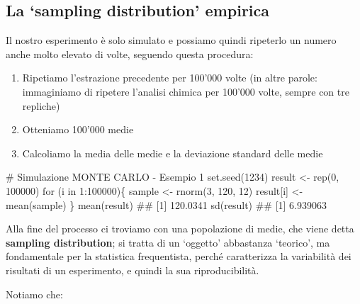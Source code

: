 \documentclass[a4paper,12pt,oneside]{book}
\providecommand{\tightlist}{%
  \setlength{\itemsep}{0pt}\setlength{\parskip}{0pt}}
\newenvironment{Shaded}{\begin{snugshade}}{\end{snugshade}}
\newcommand{\DecValTok}[1]{#1}
\newcommand{\SpecialCharTok}[1]{#1}
\newcommand{\CommentTok}[1]{#1}
\newcommand{\DocumentationTok}[1]{#1}
\newcommand{\OtherTok}[1]{#1}
\newcommand{\FunctionTok}[1]{#1}
\newcommand{\ControlFlowTok}[1]{#1}
\newcommand{\NormalTok}[1]{#1}
\begin{document}
\hypertarget{la-sampling-distribution-empirica}{%
\subsection{La `sampling distribution' empirica}\label{la-sampling-distribution-empirica}}

Il nostro esperimento è solo simulato e possiamo quindi ripeterlo un numero anche molto elevato di volte, seguendo questa procedura:

\begin{enumerate}
\def\labelenumi{\arabic{enumi}.}
\tightlist
\item
  Ripetiamo l'estrazione precedente per 100'000 volte (in altre parole: immaginiamo di ripetere l'analisi chimica per 100'000 volte, sempre con tre repliche)
\item
  Otteniamo 100'000 medie
\item
  Calcoliamo la media delle medie e la deviazione standard delle medie
\end{enumerate}

\begin{Shaded}
\begin{Highlighting}[]
\CommentTok{\# Simulazione MONTE CARLO {-} Esempio 1}
\FunctionTok{set.seed}\NormalTok{(}\DecValTok{1234}\NormalTok{)}
\NormalTok{result }\OtherTok{\textless{}{-}} \FunctionTok{rep}\NormalTok{(}\DecValTok{0}\NormalTok{, }\DecValTok{100000}\NormalTok{)}
\ControlFlowTok{for}\NormalTok{ (i }\ControlFlowTok{in} \DecValTok{1}\SpecialCharTok{:}\DecValTok{100000}\NormalTok{)\{}
\NormalTok{  sample }\OtherTok{\textless{}{-}} \FunctionTok{rnorm}\NormalTok{(}\DecValTok{3}\NormalTok{, }\DecValTok{120}\NormalTok{, }\DecValTok{12}\NormalTok{)}
\NormalTok{  result[i] }\OtherTok{\textless{}{-}} \FunctionTok{mean}\NormalTok{(sample)}
\NormalTok{\}}
\FunctionTok{mean}\NormalTok{(result)}
\DocumentationTok{\#\# [1] 120.0341}
\FunctionTok{sd}\NormalTok{(result)}
\DocumentationTok{\#\# [1] 6.939063}
\end{Highlighting}
\end{Shaded}

Alla fine del processo ci troviamo con una popolazione di medie, che viene detta \textbf{sampling distribution}; si tratta di un `oggetto' abbastanza `teorico', ma fondamentale per la statistica frequentista, perché caratterizza la variabilità dei risultati di un esperimento, e quindi la sua riproducibilità.

Notiamo che:
\end{document}
